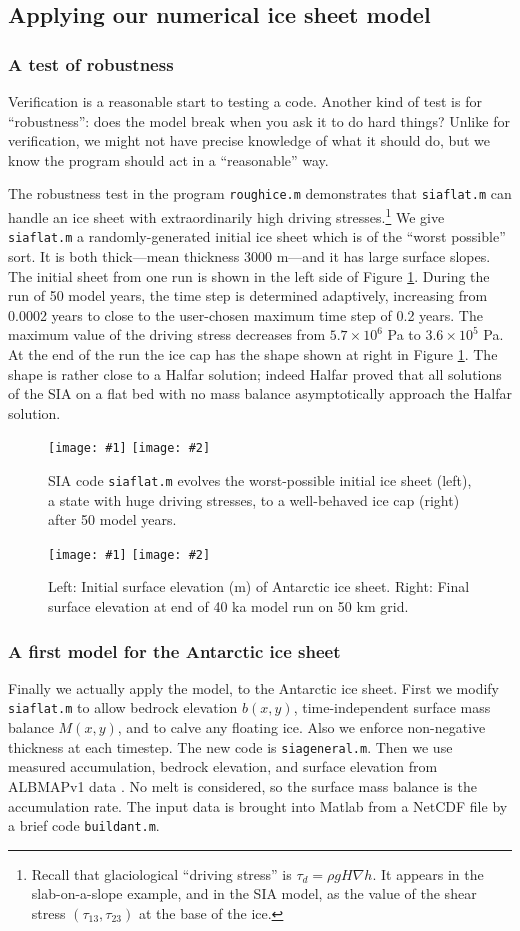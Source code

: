 \documentclass[titlepage,letterpaper,final,12pt]{scrartcl}
\newcommand{\grad}{\nabla}
\newcommand{\twofigsizes}[5]{
\begin{figure}[ht]
\centering
\texttt{[image: \#1]} \quad
\texttt{[image: \#2]}
\caption{#3}
\label{fig:#1}
\end{figure}}
\newcommand{\twofig}[3]{\twofigsizes{#1}{#2}{#3}{2.5in}{2.5in}}
\begin{document}
\subsection{Applying our numerical ice sheet model}

\subsubsection*{A test of robustness}  Verification is a reasonable start to testing a code.  Another kind of test is for ``robustness'': does the model break when you ask it to do hard things?  Unlike for verification, we might not have precise knowledge of what it should do, but we know the program should act in a ``reasonable'' way.

The robustness test in the program \texttt{roughice.m} demonstrates that \texttt{siaflat.m} can handle an ice sheet with extraordinarily high driving stresses.\footnote{Recall that glaciological ``driving stress'' is $\tau_d = \rho g H \grad h$.  It appears in the slab-on-a-slope example, and in the SIA model, as the value of the shear stress $(\tau_{13},\tau_{23})$ at the base of the ice.}  We give \texttt{siaflat.m} a randomly-generated initial ice sheet which is of the ``worst possible'' sort.  It is both thick---mean thickness 3000 m---and it has large surface slopes.  The initial sheet from one run is shown in the left side of Figure \ref{fig:roughinitial}.  During the run of 50 model years, the time step is determined adaptively, increasing from 0.0002 years to close to the user-chosen maximum time step of 0.2 years.  The maximum value of the driving stress decreases from $5.7\times 10^6$ Pa to $3.6\times 10^5$ Pa.  At the end of the run the ice cap has the shape shown at right in Figure \ref{fig:roughinitial}.  The shape is rather close to a Halfar solution; indeed Halfar proved that all solutions of the SIA on a flat bed with no mass balance asymptotically approach the Halfar solution.

\twofig{roughinitial}{roughfinal}{SIA code \texttt{siaflat.m} evolves the worst-possible initial ice sheet (left), a state with huge driving stresses, to a well-behaved ice cap (right) after 50 model years.}

\twofigsizes{antinitial}{antfinal}{Left: Initial surface elevation (m) of Antarctic ice sheet.  Right: Final surface elevation at end of 40 ka model run on 50 km grid.}{2.55in}{3.2in}

\subsubsection*{A first model for the Antarctic ice sheet}  Finally we actually apply the model, to the Antarctic ice sheet.  First we modify \texttt{siaflat.m} to allow bedrock elevation $b(x,y)$, time-independent surface mass balance $M(x,y)$, and to calve any floating ice.  Also we enforce non-negative thickness at each timestep.  The new code is \texttt{siageneral.m}.  Then we use measured accumulation, bedrock elevation, and surface elevation from ALBMAPv1 data \cite{LeBrocqetal2010}.  No melt is considered, so the surface mass balance is the accumulation rate.  The input data is brought into Matlab from a NetCDF file by a brief code \texttt{buildant.m}.
\end{document}
